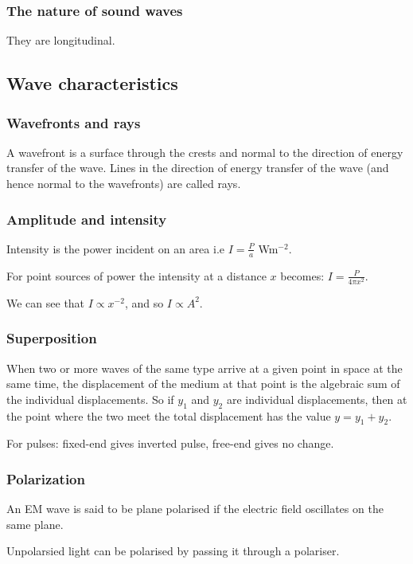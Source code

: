 \subsubsection{The nature of sound waves}
They are longitudinal.

\subsection{Wave characteristics}

\subsubsection{Wavefronts and rays}
A wavefront is a surface through the crests and normal to the direction of
energy transfer of the wave. Lines in the direction of energy transfer of the
wave (and hence normal to the wavefronts) are called rays.

\subsubsection{Amplitude and intensity}
Intensity is the power incident on an area i.e $I = \frac{P}{a}$ Wm$^{-2}$.

For point sources of power the intensity at a distance $x$ becomes:
$I = \frac{P}{4\pi x^2}$.

We can see that $I \propto x^{-2}$, and so $I \propto A^2$.

\subsubsection{Superposition}
When two or more waves of the same type arrive at a given point in space at the
same time, the displacement of the medium at that point is the algebraic sum of
the individual displacements. So if $y_1$ and $y_2$ are individual
displacements, then at the point where the two meet the total displacement has
the value $y = y_1 + y_2$.

For pulses: fixed-end gives inverted pulse, free-end gives no change.

\subsubsection{Polarization}
An EM wave is said to be plane polarised if the electric field oscillates on
the same plane.

Unpolarsied light can be polarised by passing it through a polariser.

